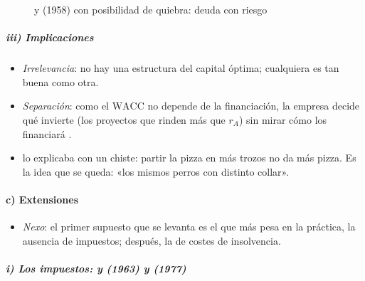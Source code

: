 \documentclass[11pt]{article}
\begin{document}
\begin{figure}[H]
\centering
\caption{ y  (1958) con posibilidad de quiebra: deuda con riesgo}\label{fig:coste-mm-riesgo}
\end{figure}

\subparagraph{iii) Implicaciones}

\begin{itemize}
\item \emph{Irrelevancia}: no hay una estructura del capital óptima; cualquiera es tan buena como otra.
\item \emph{Separación}: como el $\mathrm{WACC}$ no depende de la financiación, la empresa decide qué invierte (los proyectos que rinden más que $r_A$) sin mirar cómo los financiará  .
\item {} lo explicaba con un chiste: partir la pizza en más trozos no da más pizza\nocite{ChicagoBoothMiller}. Es la idea que se queda: «los mismos perros con distinto collar».
\end{itemize}

\paragraph{c) Extensiones}

\begin{itemize}
\item \emph{Nexo}: el primer supuesto que se levanta es el que más pesa en la práctica, la ausencia de impuestos; después, la de costes de insolvencia.
\end{itemize}

\subparagraph{i) Los impuestos:  y  (1963) y  (1977)}
\end{document}

